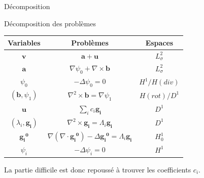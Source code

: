 \documentclass{beamer}
\newcommand{\grad}{{\nabla}}
\newcommand{\laplace}{{\Delta}}
\newcommand{\rot}{{\nabla\times}}
\newcommand{\rott}{{\nabla^2\times}}
\renewcommand{\div}{{\nabla\cdot}}
\begin{document}
\begin{frame}{Décomposition}
\begin{block}{Décomposition des problèmes}
\begin{center}
\begin{tabular}{|c|c|c|}
\hline
Variables & Problèmes & Espaces\\ \hline
$\mathbf{v}$ & $\mathbf{a} + \mathbf{u}$ & $ L^2_\sigma$\\ \hline
$\mathbf{a}$ & $\grad\psi_0 + \rot \mathbf{b}$ & $ L^2_\sigma$\\ \hline
$\psi_0$ & $-\laplace\psi_0 = 0$ & $ H^1/ H(div)$\\ \hline
$(\mathbf{b},\psi_1)$ & $\rott \mathbf{b}= \grad\psi_1$ & $ H(rot)/ D^1$ \\ \hline
$\mathbf{u}$ & $\sum_i c_i\mathbf{g_i}$ & $ D^1$\\ \hline
$(\lambda_i,\mathbf{g_i})$ & $\rott  \mathbf{g_i} = \Lambda_i \mathbf{g_i}$ & $ D^1$ \\ \hline
$\mathbf{\mathbf{g_i}^0}$ & $\grad(\div \mathbf{\mathbf{g_i}^0}) - \laplace \mathbf{\mathbf{g_i}^0} = \Lambda_i \mathbf{g_i}$ & $ H^1_0$\\ \hline
$\psi_i$ & $-\laplace \psi_i = 0$ & $ H^1$\\ \hline
\end{tabular}
\end{center}
La partie difficile est donc repoussé à trouver les coefficients $c_i$. 
\end{block}
\end{frame}
\end{document}
